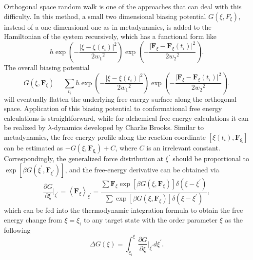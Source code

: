 Orthogonal space random walk is one of the approaches that can deal with this difficulty. In this method, a small two dimensional biasing potential $G(\xi,F_{\xi})$, instead of a one-dimensional one as in metadynamics, is added to the Hamiltonian of the system recursively, which has a functional form like
\begin{equation}
   h\exp{\left(-\frac{\lvert\xi-\xi(t_i)\rvert^2}{2{w_1}^2}\right)}\exp{\left(-\frac{\lvert \mathbf{F}_{\xi}-\mathbf{F}_{\xi}(t_i)\rvert^2}{2{w_2}^2}\right)}.
\end{equation}
The overall biasing potential
\begin{equation}
G(\xi,\mathbf{F}_\xi)=\sum\limits_{t_i}h\exp{\left(-\frac{\lvert\xi-\xi(t_i)\rvert^2}{2{w_1}^2}\right)}\exp{\left(-\frac{\lvert \mathbf{F}_{\xi}-\mathbf{F}_{\xi}(t_i)\rvert^2}{2{w_2}^2}\right)}.
\end{equation}
will eventually flatten the underlying free energy surface along the orthogonal space.
Application of this biasing potential to conformational free energy calculations is straightforward, while for alchemical free energy calculations it can be realized by $\lambda$-dynamics developed by Charlie Brooks.\cite{KnightJCC2009} Similar to metadynamics, the free energy profile along the reaction coordinate $\left[\xi(t_i), \mathbf{F_\xi}\right]$ can be estimated as $-G\left(\xi,\mathbf{F_{\xi}}\right)+C$, where $C$ is an irrelevant constant. Correspondingly, the generalized force distribution at $\xi^\prime$ should be proportional to $\exp{\left[\beta G\left(\xi^\prime,\mathbf{F}_{\xi^\prime}\right)\right]}$, and the free-energy derivative can be obtained via
\begin{equation}
	\frac{\partial G}{\partial \xi}\bigg\rvert_{\xi^\prime}=\left<\mathbf{F}_\xi\right>_{\xi^\prime}=\frac{\sum\mathbf{F}_\xi\exp{\left[\beta G(\xi,\mathbf{F}_\xi)\right]}\delta(\xi-\xi^\prime)}{\sum\exp{\left[\beta G(\xi,\mathbf{F}_\xi)\right]}\delta(\xi-\xi^\prime)},
\end{equation}
which can be fed into the thermodynamic integration formula to obtain the free energy change from $\xi=\xi_i$ to any target state with the order parameter $\xi$ as the following
\begin{equation}
	\Delta G(\xi) = \int_{\xi_i}^{\xi}\frac{\partial G}{\partial \xi}\bigg\rvert_{\xi^\prime}d\xi^\prime.
\end{equation}